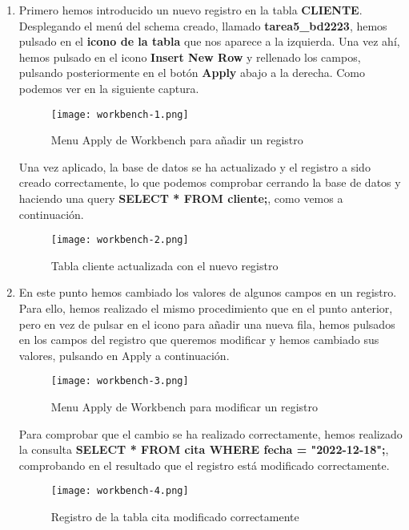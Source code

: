 \begin{enumerate}
    \item Primero hemos introducido un nuevo registro en la tabla \textbf{CLIENTE}. Desplegando el menú del schema creado, llamado \textbf{tarea5\_bd2223}, hemos pulsado en el \textbf{icono de la tabla} que nos aparece a la izquierda. Una vez ahí, hemos pulsado en el icono \textbf{Insert New Row} y rellenado los campos, pulsando posteriormente en el botón \textbf{Apply} abajo a la derecha. Como podemos ver en la siguiente captura.

    \begin{figure}[H]
        \centering
        \texttt{[image: workbench-1.png]}
        \caption{Menu Apply de Workbench para añadir un registro}
    \end{figure}

    Una vez aplicado, la base de datos se ha actualizado y el registro a sido creado correctamente, lo que podemos comprobar cerrando la base de datos y haciendo una query \textbf{SELECT * FROM cliente;}, como vemos a continuación.

    \begin{figure}[H]
        \centering
        \texttt{[image: workbench-2.png]}
        \caption{Tabla cliente actualizada con el nuevo registro}
    \end{figure}

    \item En este punto hemos cambiado los valores de algunos campos en un registro. Para ello, hemos realizado el mismo procedimiento que en el punto anterior, pero en vez de pulsar en el icono para añadir una nueva fila, hemos pulsados en los campos del registro que queremos modificar y hemos cambiado sus valores, pulsando en Apply a continuación.

      \begin{figure}[H]
        \centering
        \texttt{[image: workbench-3.png]}
        \caption{Menu Apply de Workbench para modificar un registro}
    \end{figure}

    Para comprobar que el cambio se ha realizado correctamente, hemos realizado la consulta \textbf{SELECT * FROM cita WHERE fecha = "2022-12-18";}, comprobando en el resultado que el registro está modificado correctamente.

        \begin{figure}[H]
        \centering
        \texttt{[image: workbench-4.png]}
        \caption{Registro de la tabla cita modificado correctamente}
    \end{figure}


\end{enumerate}
